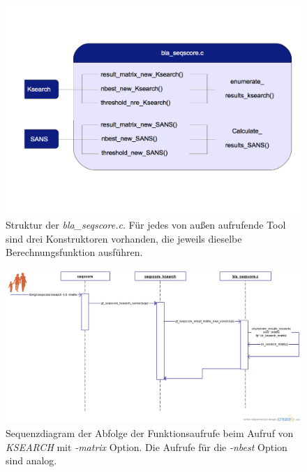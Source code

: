 \documentclass{article}
\begin{document}
\begin{center}
  \begin{figure}
    \includegraphics[width = \linewidth]{img/dia2}
    \caption{Struktur der \emph{bla\_seqscore.c}. Für jedes von außen aufrufende Tool sind drei Konstruktoren vorhanden, die jeweils dieselbe Berechnungsfunktion ausführen.}
    \label{seqsc}
  \end{figure}
\end{center}

\begin{center}
  \begin{figure}
    \includegraphics[width = \linewidth]{img/seqscore_seqence_fam.png}
    \caption{Sequenzdiagram der Abfolge der Funktionsaufrufe beim Aufruf von \emph{KSEARCH} mit \emph{-matrix} Option. Die Aufrufe für die \emph{-nbest} Option sind analog.}
    \label{manbes}
  \end{figure}
\end{center}
\end{document}
